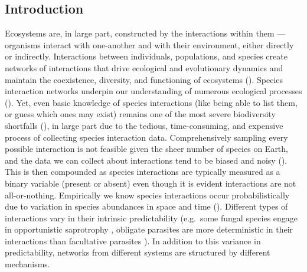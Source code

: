 \begin{refsection}

\section{Introduction}\label{introduction}

Ecosystems are, in large part, constructed by the interactions within
them --- organisms interact with one-another and with their environment,
either directly or indirectly. Interactions between individuals,
populations, and species create networks of interactions that drive
ecological and evolutionary dynamics and maintain the coexistence,
diversity, and functioning of ecosystems (\cite{Delmas2018Analysing, Landi2018Complexity, Albrecht2018Plant}). Species interaction networks
underpin our understanding of numerous ecological processes
(\cite{Pascual2006EcoNet, Heleno2014EcoNet}). Yet, even basic knowledge
of species interactions (like being able to list them, or guess which
ones may exist) remains one of the most severe biodiversity shortfalls
(\cite{Hortal2015Seven}), in large part due to the tedious,
time-consuming, and expensive process of collecting species interaction
data. Comprehensively sampling every possible interaction is not
feasible given the sheer number of species on Earth, and the data we can
collect about interactions tend to be biased and noisy
(\cite{deAguiar2019RevBia}). This is then compounded as species
interactions are typically measured as a binary variable (present or
absent) even though it is evident interactions are not all-or-nothing.
Empirically we know species interactions occur probabilistically due to
variation in species abundances in space and time
(\cite{Poisot2015Species}). Different types of interactions vary in their
intrinsic predictability (e.g.~some fungal species engage in
opportunistic saprotrophy \cite{Smith2017GroEvi}, obligate parasites are
more deterministic in their interactions than facultative parasites
\cite{Poisot2013FacObl, Luong2019FacPar}). In addition to this variance
in predictability, networks from different systems are structured by
different mechanisms.


\end{refsection}
